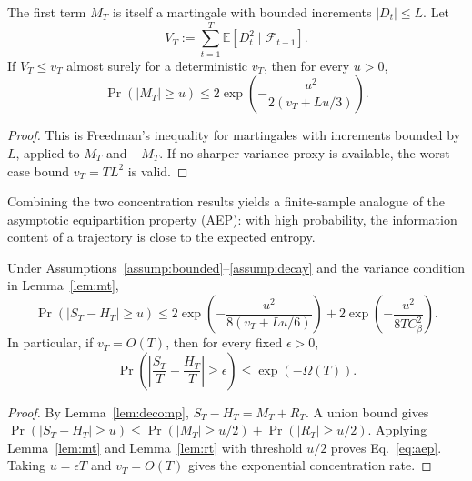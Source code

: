 \documentclass{llmxive}
\begin{document}
\begin{lemma}[Concentration of $M_T$]
\label{lem:mt}
The first term $M_T$ is itself a martingale with bounded increments $|D_t| \le L$. Let
\begin{equation}
  V_T:=\sum_{t=1}^{T}\mathbb{E}[D_t^2\mid\mathcal{F}_{t-1}].
\end{equation}
If $V_T\le v_T$ almost surely for a deterministic $v_T$, then for every $u>0$,
\begin{equation}
  \Pr(|M_T|\ge u)
  \le 2\exp\!\left(-\frac{u^2}{2(v_T+Lu/3)}\right).
  \label{eq:mt-freedman}
\end{equation}
\end{lemma}

\begin{proof}
This is Freedman's inequality for martingales with increments bounded by $L$, applied to $M_T$ and $-M_T$. If no sharper variance proxy is available, the worst-case bound $v_T=TL^2$ is valid.
\end{proof}


Combining the two concentration results yields a finite-sample analogue of the asymptotic equipartition property (AEP): with high probability, the information content of a trajectory is close to the expected entropy.

\begin{theorem}
\label{thm:aep}
Under Assumptions~\ref{assump:bounded}--\ref{assump:decay} and the variance condition in Lemma~\ref{lem:mt},
\begin{equation}
  \Pr(|S_T-H_T|\ge u)
  \le
  2\exp\!\left(-\frac{u^2}{8(v_T+Lu/6)}\right)
  +2\exp\!\left(-\frac{u^2}{8TC_\beta^2}\right).
  \label{eq:aep}
\end{equation}
In particular, if $v_T=O(T)$, then for every fixed $\epsilon>0$,
\begin{equation}
  \Pr\!\left(\left|\frac{S_T}{T}-\frac{H_T}{T}\right|\ge\epsilon\right)
  \le \exp(-\Omega(T)).
\end{equation}
\end{theorem}

\begin{proof}
By Lemma~\ref{lem:decomp}, $S_T-H_T=M_T+R_T$. A union bound gives
$\Pr(|S_T-H_T|\ge u) \le \Pr(|M_T|\ge u/2)+\Pr(|R_T|\ge u/2)$.
Applying Lemma~\ref{lem:mt} and Lemma~\ref{lem:rt} with threshold $u/2$ proves Eq.~\eqref{eq:aep}. Taking $u=\epsilon T$ and $v_T=O(T)$ gives the exponential concentration rate.
\end{proof}
\end{document}
